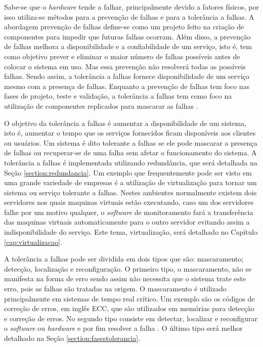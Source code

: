 Sabe-se que o \textit{hardware} tende a falhar, principalmente devido a fatores físicos, por isso utiliza-se métodos para a prevenção 
de falhas e para a tolerância a falhas. A abordagem prevenção de falhas define-se como um projeto feito na criação de componentes para
impedir que futuras falhas ocorram. Além disso, a prevenção de falhas melhora a disponibilidade e a confiabilidade de um serviço, isto é, 
tem como objetivo prever e eliminar o maior número de falhas possíveis antes de colocar o sistema em uso. Mas essa prevenção não resolverá 
todas as possíveis falhas. Sendo assim, a tolerância a falhas fornece disponibilidade de um serviço mesmo com a presença de falhas. 
Enquanto a prevenção de falhas tem foco nas fases de projeto, teste e validação, a tolerância a falhas tem como foco na utilização de 
componentes replicados para mascarar as falhas \cite{pankaj1994}.

O objetivo da tolerância a falhas é aumentar a disponibilidade de um sistema, isto é, aumentar o tempo que os serviços fornecidos ficam 
disponíveis aos clientes ou usuários. Um sistema é dito tolerante a falhas se ele pode mascarar a presença de falhas ou recuperar-se 
de uma falha sem afetar o funcionamento do sistema. A tolerância a falhas é implementada utilizando redundância, que será detalhada na 
Seção \ref{section:redundancia}. Um exemplo que frequentemente pode ser visto em uma grande variedade de empresas é a utilização de 
virtualização para tornar um sistema ou serviço tolerante a falhas. Nestes ambientes normalmente existem dois servidores nos quais 
maquinas virtuais estão executando, caso um dos servidores falhe por um motivo qualquer, o \textit{software} de monitoramento fará a 
transferência das maquinas virtuais automaticamente para o outro servidor evitando assim a indisponibilidade do serviço. 
Este tema, virtualização, será detalhado no Capítulo \ref{cap:virtualizacao}.

A tolerância a falhas pode ser dividida em dois tipos que são: mascaramento; detecção, localização e reconfiguração.
O primeiro tipo, o mascaramento, não se manifesta na forma de erro sendo assim não necessita que o sistema trate este erro,
pois as falhas são tratadas na origem. O mascaramento é utilizado principalmente em sistemas de tempo real crítico. 
Um exemplo são os códigos de correção de erros, em inglês \ac{ECC}, que são utilizados em memórias para detecção e correção de erros.
No segundo tipo consiste em detectar, localizar e reconfigurar o \textit{software} ou \textit{hardware} e por fim resolver a 
falha \cite{weber2002}. O último tipo será melhor detalhado na Seção \ref{section:fasestolerancia}.

